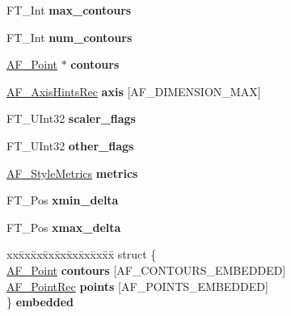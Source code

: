 \begin{DoxyCompactItemize}
\item 
\mbox{\label{struct_a_f___glyph_hints_rec___a35a606267660f48f4ad8d760c2ef4923}} 
F\+T\+\_\+\+Int {\bfseries max\+\_\+contours}
\item 
\mbox{\label{struct_a_f___glyph_hints_rec___a18ba949b227ee6fa34355872546209ed}} 
F\+T\+\_\+\+Int {\bfseries num\+\_\+contours}
\item 
\mbox{\label{struct_a_f___glyph_hints_rec___a3ee48b0ccf627aa1d84895aa2a058e57}} 
\hyperlink{struct_a_f___point_rec__}{A\+F\+\_\+\+Point} $\ast$ {\bfseries contours}
\item 
\mbox{\label{struct_a_f___glyph_hints_rec___a88d06a7880ba2423c73f937b7baedb46}} 
\hyperlink{struct_a_f___axis_hints_rec__}{A\+F\+\_\+\+Axis\+Hints\+Rec} {\bfseries axis} \mbox{[}A\+F\+\_\+\+D\+I\+M\+E\+N\+S\+I\+O\+N\+\_\+\+M\+AX\mbox{]}
\item 
\mbox{\label{struct_a_f___glyph_hints_rec___acec0d3686263f68031080d9207e2ccf5}} 
F\+T\+\_\+\+U\+Int32 {\bfseries scaler\+\_\+flags}
\item 
\mbox{\label{struct_a_f___glyph_hints_rec___a4c6825c53e6f2c234b20cc07edb0bb85}} 
F\+T\+\_\+\+U\+Int32 {\bfseries other\+\_\+flags}
\item 
\mbox{\label{struct_a_f___glyph_hints_rec___a15d4537375cfaf3369e12431e1c220ea}} 
\hyperlink{struct_a_f___style_metrics_rec__}{A\+F\+\_\+\+Style\+Metrics} {\bfseries metrics}
\item 
\mbox{\label{struct_a_f___glyph_hints_rec___a0ac4de48acaeff02893732d214e140cd}} 
F\+T\+\_\+\+Pos {\bfseries xmin\+\_\+delta}
\item 
\mbox{\label{struct_a_f___glyph_hints_rec___afb54e12df9090871946f1386bb5a5719}} 
F\+T\+\_\+\+Pos {\bfseries xmax\+\_\+delta}
\item 
\mbox{\label{struct_a_f___glyph_hints_rec___a064cf6415041c68617dac435284843f2}} 
\begin{tabbing}
xx\=xx\=xx\=xx\=xx\=xx\=xx\=xx\=xx\=\kill
struct \{\\
\>\hyperlink{struct_a_f___point_rec__}{AF\_Point} {\bfseries contours} \mbox{[}AF\_CONTOURS\_EMBEDDED\mbox{]}\\
\>\hyperlink{struct_a_f___point_rec__}{AF\_PointRec} {\bfseries points} \mbox{[}AF\_POINTS\_EMBEDDED\mbox{]}\\
\} {\bfseries embedded}\\


\end{tabbing}
\end{DoxyCompactItemize}
